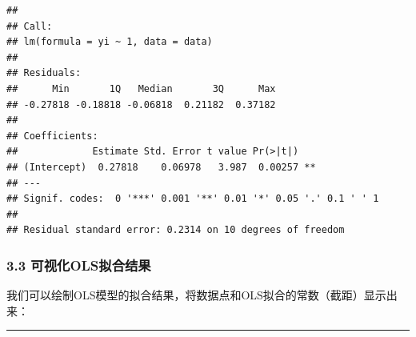 \documentclass[
  10pt,
]{ctexart}
\newenvironment{Shaded}{\begin{snugshade}}{\end{snugshade}}
\newcommand{\AttributeTok}[1]{\textcolor[rgb]{0.13,0.29,0.53}{#1}}
\newcommand{\CommentTok}[1]{\textcolor[rgb]{0.56,0.35,0.01}{\textit{#1}}}
\newcommand{\ConstantTok}[1]{\textcolor[rgb]{0.56,0.35,0.01}{#1}}
\newcommand{\DecValTok}[1]{\textcolor[rgb]{0.00,0.00,0.81}{#1}}
\newcommand{\FunctionTok}[1]{\textcolor[rgb]{0.13,0.29,0.53}{\textbf{#1}}}
\newcommand{\NormalTok}[1]{#1}
\newcommand{\SpecialCharTok}[1]{\textcolor[rgb]{0.81,0.36,0.00}{\textbf{#1}}}
\newcommand{\StringTok}[1]{\textcolor[rgb]{0.31,0.60,0.02}{#1}}
\begin{document}
\begin{verbatim}
## 
## Call:
## lm(formula = yi ~ 1, data = data)
## 
## Residuals:
##      Min       1Q   Median       3Q      Max 
## -0.27818 -0.18818 -0.06818  0.21182  0.37182 
## 
## Coefficients:
##             Estimate Std. Error t value Pr(>|t|)   
## (Intercept)  0.27818    0.06978   3.987  0.00257 **
## ---
## Signif. codes:  0 '***' 0.001 '**' 0.01 '*' 0.05 '.' 0.1 ' ' 1
## 
## Residual standard error: 0.2314 on 10 degrees of freedom
\end{verbatim}

\hypertarget{ux53efux89c6ux5316olsux62dfux5408ux7ed3ux679c}{%
\subsubsection{3.3
可视化OLS拟合结果}\label{ux53efux89c6ux5316olsux62dfux5408ux7ed3ux679c}}

我们可以绘制OLS模型的拟合结果，将数据点和OLS拟合的常数（截距）显示出来：

\begin{Shaded}
\end{Shaded}

\begin{center}\rule{0.5\linewidth}{0.5pt}\end{center}
\end{document}
